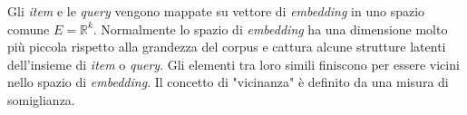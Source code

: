 \documentclass{article}
\begin{document}
Gli \textit{item} e le \textit{query} vengono mappate su  vettore di \textit{embedding} in uno spazio comune $E = \mathbb{R}^k$. Normalmente lo spazio di \textit{embedding} ha una dimensione molto più piccola rispetto alla grandezza del corpus e cattura alcune strutture latenti dell'insieme di \textit{item} o \textit{query}. Gli elementi tra loro simili finiscono per essere vicini nello spazio di \textit{embedding}. Il concetto di "vicinanza" è definito da una misura di somiglianza.



\end{document}
